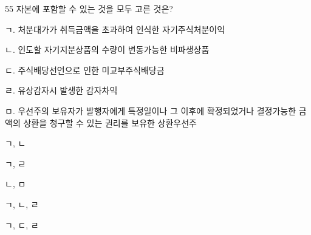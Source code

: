 \begin{question}{55}
자본에 포함할 수 있는 것을 모두 고른 것은?
\begin{framedtext}
ㄱ. 처분대가가 취득금액을 초과하여 인식한 자기주식처분이익 \par
ㄴ. 인도할 자기지분상품의 수량이 변동가능한 비파생상품 \par
ㄷ. 주식배당선언으로 인한 미교부주식배당금 \par
ㄹ. 유상감자시 발생한 감자차익 \par
ㅁ. 우선주의 보유자가 발행자에게 특정일이나 그 이후에 확정되었거나 결정가능한 금액의 상환을 청구할 수 있는 권리를 보유한 상환우선주 \par
\end{framedtext}
\begin{choices}
  \item ㄱ, ㄴ
  \item ㄱ, ㄹ
  \item ㄴ, ㅁ
  \item ㄱ, ㄴ, ㄹ
  \item ㄱ, ㄷ, ㄹ
\end{choices}
\end{question}
